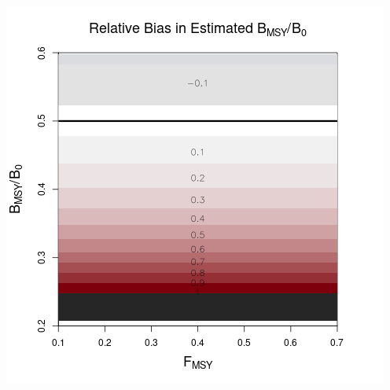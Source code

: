 \documentclass[ xcolor = pdftex, dvipsnames, table ]{beamer}
\begin{document}
%
\begin{frame}%
\begin{minipage}[h!]{0.49\textwidth}
$~$\\\\
\includegraphics[height=0.55\textheight]{../../.././nick/gpBias/zetaRelBiasPellaFlatNoQ.png}
\end{minipage}
\begin{minipage}[h!]{0.49\textwidth}
\hspace*{-0.5cm}

\end{minipage}
\end{frame}
\end{document}
